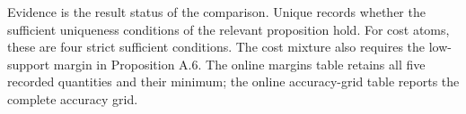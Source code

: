 \begin{threeparttable}
\begin{tablenotes}
\item Evidence is the result status of the comparison. Unique records whether the sufficient uniqueness conditions of the relevant proposition hold. For cost atoms, these are four strict sufficient conditions. The cost mixture also requires the low-support margin in Proposition A.6. The online margins table retains all five recorded quantities and their minimum; the online accuracy-grid table reports the complete accuracy grid.
\end{tablenotes}
\end{threeparttable}
